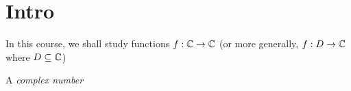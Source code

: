 \section{Intro}
\noindent In this course, we shall study functions $f:\mathbb{C}\to\mathbb{C}$ (or more generally, $f:D\to\mathbb{C}$ where $D\subseteq\mathbb{C}$)
\par\bigskip
\begin{theo}
  A \textit{complex number}
\end{theo}
